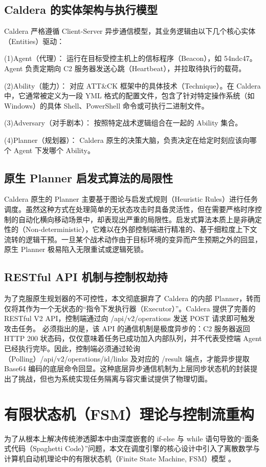 \documentclass[twoside,openright]{xduugthesis}
\begin{document}
\subsection{ Caldera 的实体架构与执行模型}
Caldera 严格遵循 Client-Server 异步通信模型，其业务逻辑由以下几个核心实体（Entities）驱动：

(1)Agent（代理）： 运行在目标受控主机上的信标程序（Beacon），如 54ndc47。Agent 负责定期向 C2 服务器发送心跳（Heartbeat），并拉取待执行的载荷。

(2)Ability（能力）： 对应 ATT\&CK 框架中的具体技术（Technique）。在 Caldera 中，它通常被定义为一段 YML 格式的配置文件，包含了针对特定操作系统（如 Windows）的具体 Shell、PowerShell 命令或可执行二进制文件。

(3)Adversary（对手剧本）： 按照特定战术逻辑组合在一起的 Ability 集合。

(4)Planner（规划器）： Caldera 原生的决策大脑，负责决定在给定时刻应该向哪个 Agent 下发哪个 Ability。

\subsection{ 原生 Planner 启发式算法的局限性}
Caldera 原生的 Planner 主要基于图论与启发式规则（Heuristic Rules）进行任务调度。虽然这种方式在处理简单的无状态攻击时具备灵活性，但在需要严格时序控制的自动化横向移动场景中，却表现出严重的局限性。启发式算法本质上是非确定性的（Non-deterministic），它难以在外部控制端进行精准的、基于细粒度上下文流转的逻辑干预。一旦某个战术动作由于目标环境的变异而产生预期之外的回显，原生 Planner 极易陷入无限重试或逻辑死锁。
\subsection{RESTful API 机制与控制权劫持}
为了克服原生规划器的不可控性，本文彻底摒弃了 Caldera 的内部 Planner，转而仅将其作为一个无状态的“指令下发执行器（Executor）”。Caldera 提供了完善的 RESTful V2 API，控制端通过向 /api/v2/operations 发送 POST 请求即可触发攻击任务。
必须指出的是，该 API 的通信机制是极度异步的：C2 服务器返回 HTTP 200 状态码，仅仅意味着任务已成功加入内部队列，并不代表受控端 Agent 已经执行完毕。因此，控制端必须通过轮询（Polling）/api/v2/operations/{id}/links 及对应的 /result 端点，才能异步提取 Base64 编码的底层命令回显。这种底层异步通信机制为上层同步状态机的封装提出了挑战，但也为系统实现任务隔离与容灾重试提供了物理切面。
\section{有限状态机（FSM）理论与控制流重构}
为了从根本上解决传统渗透脚本中由深度嵌套的 if-else 与 while 语句导致的“面条式代码（Spaghetti Code）”问题，本文在调度引擎的核心设计中引入了离散数学与计算机自动机理论中的有限状态机（Finite State Machine, FSM）模型 。
\end{document}
